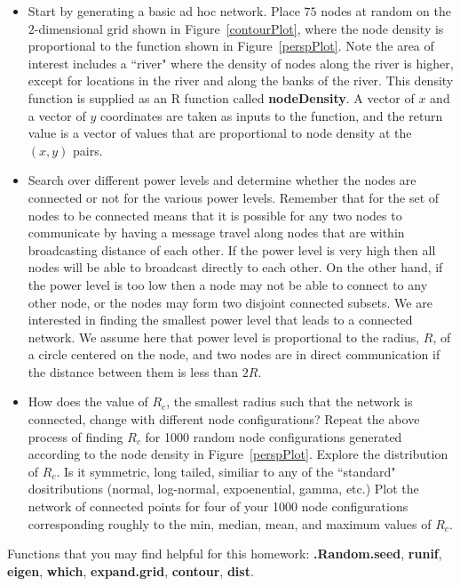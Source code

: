 \documentclass[12pt]{article}
\def\SFunctionRef#1{\textbf{#1}}
\def\SFunction#1{\textbf{#1}}
\begin{document}
\begin{itemize}
\item Start by generating a basic ad hoc network.  Place $75$ nodes 
 at random on the $2$-dimensional grid shown in Figure~\ref{contourPlot}, 
 where the node density is proportional to the function shown in 
 Figure~\ref{perspPlot}. Note the area of interest includes a ``river"
 where the density of nodes along the river is higher, except for 
 locations in the river and along the banks of the river. 
 This density function is supplied as an R function called 
\SFunctionRef{nodeDensity}. A vector of $x$ and a vector of $y$ coordinates 
 are taken as inputs to the function, and the return value is a vector
 of values that are proportional to node density at the $(x, y)$ pairs. 

\item Search over different power levels and determine whether the nodes are 
connected or not for the various power levels.  
Remember that for the set of nodes to be connected means that
it is possible for any two nodes to communicate by having a message
travel along nodes that are within broadcasting distance of each other.
If the power level is very high then all nodes will be able to broadcast
directly to each other. On the other hand, if the power level is too low
then a node may not be able to connect to any other node, or the nodes may
form two disjoint connected subsets. 
We are interested in finding the smallest power level that leads to a 
connected network. We assume here that power level is proportional
to the radius, $R$, of a circle centered on the node, and two nodes are 
in direct communication if the distance between them is less than $2R$.

\item How does the value of $R_c$, the smallest radius such that the
network is connected, change with different node configurations?
Repeat the above process of finding $R_c$ for 1000 random
node configurations generated according to the node density in 
Figure~\ref{perspPlot}. Explore the distribution of $R_c$. 
Is it symmetric, long tailed, similiar to any of the ``standard"
dositributions (normal, log-normal, expoenential, gamma, etc.)
Plot the network of connected points for four of your 1000 node 
configurations corresponding roughly to the min, median, mean, 
and maximum values of $R_c$. 

\end{itemize}

Functions that you may find helpful for this homework:
\SFunction{.Random.seed}, \SFunction{runif},
\SFunction{eigen}, \SFunction{which}, \SFunction{expand.grid},
\SFunction{contour}, \SFunction{dist}.
\end{document}
